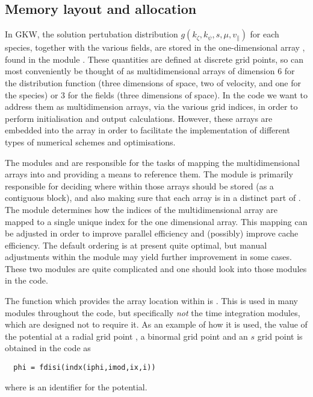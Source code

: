 \subsection{Memory layout and allocation}
\label{memorylayout}
In GKW, the solution pertubation distribution
$g(k_\zeta,k_\psi,s,\mu,v_\parallel)$ for each species, together with the
various fields, are stored in the one-dimensional array ,
found in the module . These quantities are defined at discrete grid
points, so can most conveniently be thought of as multidimensional arrays of
dimension 6 for the distribution function (three dimensions of space, two of
velocity, and one for the species) or 3 for the fields (three dimensions of
space). In the code we want to address them as multidimension arrays, via the
various grid indices, in order to perform initialisation and output
calculations. However, these arrays are embedded into the array  in
order to facilitate the implementation of different types of numerical schemes
and optimisations.

The modules  and  are responsible for the tasks
of mapping the multidimensional arrays into  and providing a means
to reference them. The  module is primarily responsible for deciding
where within  those arrays should be stored (as a contiguous
block), and also making sure that each array is in a distinct part of
. The  module determines how the indices of the
multidimensional array are mapped to a single unique index for the one
dimensional array. This mapping can be
adjusted in order to improve parallel efficiency and (possibly) improve cache
efficiency. The default ordering is at present quite optimal, but manual
adjustments within the  module may yield further
improvement in some cases. These two modules are quite complicated and one
should look into those modules in the code.

The function which provides the array location within  is
.  This is used in many modules throughout the code, but
specifically {\it not} the time integration modules, which are designed not
to require it. As an example of how it is used, the value  of the
potential at a radial grid point , a binormal grid point 
and an $s$ grid point  is obtained in the code as
\begin{Verbatim}
  phi = fdisi(indx(iphi,imod,ix,i))
\end{Verbatim}
where  is an identifier for the potential.

